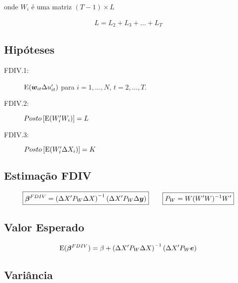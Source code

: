 \documentclass[11pt, oneside, a4paper, article]{article}
\numberwithin{equation}{section}
\begin{document}
\begin{description}
\noindent
onde $W_{i}$ é uma matriz $( T - 1 ) \times L$

\vspace{-1 em}
\begin{align*}
	L = L_{2} + L_{3} + \dots + L_{T}
\end{align*}

\subsection{Hipóteses}

\begin{description}
\item[FDIV.1:] $\text{E}( \boldsymbol{w}_{it} \Delta u_{it}')$ para $i = 1, \dots, N$, $t = 2, \dots, T$.
\item[FDIV.2:] $Posto\left[ \text{E}( W_{i}' W_{i} ) \right] = L$
\item[FDIV.3:] $Posto\left[ \text{E}( W_{i}' \Delta X_{i} ) \right] = K$
\end{description}

\subsection{Estimação FDIV}

\vspace{-1 em}
\begin{align*}
\boxed{
\boldsymbol{\beta}^{FDIV} =  
\left(
\Delta X' P_{W} \Delta X 
\right)^{-1}
\left(
\Delta X' P_{W} \Delta \boldsymbol{y}
\right)
}
\qquad
\boxed{
P_{W} = W(W'W)^{-1}W'}
\end{align*}

\subsection{Valor Esperado}

\vspace{-1 em}
\begin{align*}
\text{E}( \boldsymbol{\beta}^{FDIV} ) =  
\beta + 
\left( \Delta X' P_{W} \Delta X \right)^{-1}
\left( \Delta X' P_{W} \boldsymbol{e} \right)
\end{align*}

\subsection{Variância}


\end{description}
\end{document}
